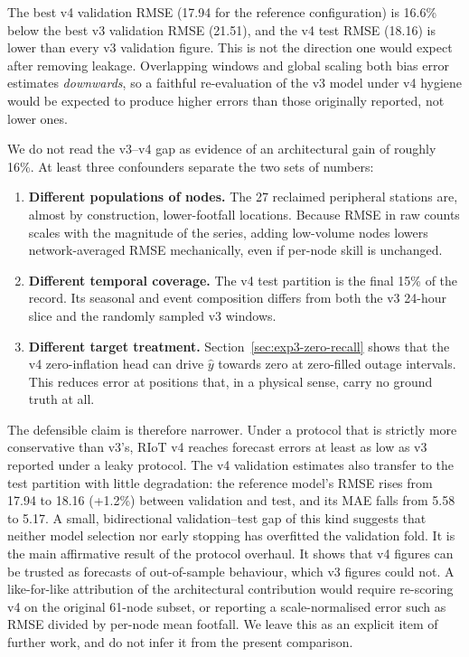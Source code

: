 The best v4 validation RMSE (17.94 for the reference configuration) is
16.6\% below the best v3 validation RMSE (21.51), and the v4 test RMSE
(18.16) is lower than every v3 validation figure. This is not the
direction one would expect after removing leakage. Overlapping windows
and global scaling both bias error estimates \emph{downwards}, so a
faithful re-evaluation of the v3 model under v4 hygiene would be expected
to produce higher errors than those originally reported, not lower ones.

We do not read the v3--v4 gap as evidence of an architectural gain of
roughly 16\%. At least three confounders separate the two sets of
numbers:

\begin{enumerate}
    \item \textbf{Different populations of nodes.} The 27 reclaimed
    peripheral stations are, almost by construction, lower-footfall
    locations. Because RMSE in raw counts scales with the magnitude of
    the series, adding low-volume nodes lowers network-averaged RMSE
    mechanically, even if per-node skill is unchanged.
    \item \textbf{Different temporal coverage.} The v4 test partition is
    the final 15\% of the record. Its seasonal and event composition
    differs from both the v3 24-hour slice and the randomly sampled v3
    windows.
    \item \textbf{Different target treatment.} Section~\ref{sec:exp3-zero-recall}
    shows that the v4 zero-inflation head can drive $\hat{y}$ towards
    zero at zero-filled outage intervals. This reduces error at
    positions that, in a physical sense, carry no ground truth at all.
\end{enumerate}

The defensible claim is therefore narrower. Under a protocol that is
strictly more conservative than v3's, RIoT v4 reaches forecast errors at
least as low as v3 reported under a leaky protocol. The v4 validation
estimates also transfer to the test partition with little degradation:
the reference model's RMSE rises from 17.94 to 18.16 (+1.2\%) between
validation and test, and its MAE falls from 5.58 to 5.17. A small,
bidirectional validation--test gap of this kind suggests that neither
model selection nor early stopping has overfitted the validation fold.
It is the main affirmative result of the protocol overhaul. It shows
that v4 figures can be trusted as forecasts of out-of-sample behaviour,
which v3 figures could not. A like-for-like attribution of the
architectural contribution would require re-scoring v4 on the original
61-node subset, or reporting a scale-normalised error such as RMSE
divided by per-node mean footfall. We leave this as an explicit item of
further work, and do not infer it from the present comparison.

